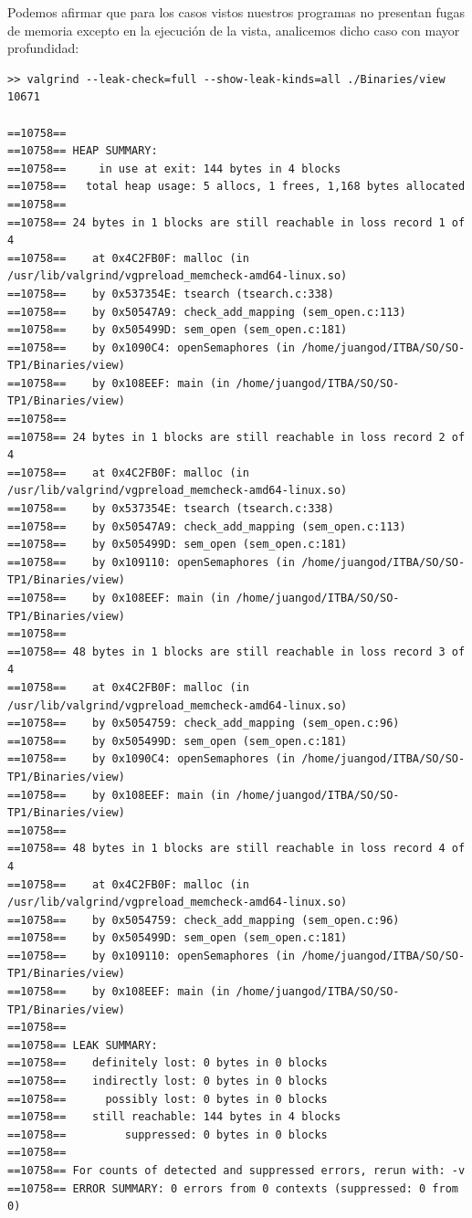 \documentclass[10pt,a4paper]{report}
\begin{document}
 Podemos afirmar que para los casos vistos nuestros programas no presentan fugas de memoria excepto en la ejecución de la vista, analicemos dicho caso con mayor profundidad:\newline\newline 

\begin{lstlisting}
>> valgrind --leak-check=full --show-leak-kinds=all ./Binaries/view 10671

==10758== 
==10758== HEAP SUMMARY:
==10758==     in use at exit: 144 bytes in 4 blocks
==10758==   total heap usage: 5 allocs, 1 frees, 1,168 bytes allocated
==10758== 
==10758== 24 bytes in 1 blocks are still reachable in loss record 1 of 4
==10758==    at 0x4C2FB0F: malloc (in /usr/lib/valgrind/vgpreload_memcheck-amd64-linux.so)
==10758==    by 0x537354E: tsearch (tsearch.c:338)
==10758==    by 0x50547A9: check_add_mapping (sem_open.c:113)
==10758==    by 0x505499D: sem_open (sem_open.c:181)
==10758==    by 0x1090C4: openSemaphores (in /home/juangod/ITBA/SO/SO-TP1/Binaries/view)
==10758==    by 0x108EEF: main (in /home/juangod/ITBA/SO/SO-TP1/Binaries/view)
==10758== 
==10758== 24 bytes in 1 blocks are still reachable in loss record 2 of 4
==10758==    at 0x4C2FB0F: malloc (in /usr/lib/valgrind/vgpreload_memcheck-amd64-linux.so)
==10758==    by 0x537354E: tsearch (tsearch.c:338)
==10758==    by 0x50547A9: check_add_mapping (sem_open.c:113)
==10758==    by 0x505499D: sem_open (sem_open.c:181)
==10758==    by 0x109110: openSemaphores (in /home/juangod/ITBA/SO/SO-TP1/Binaries/view)
==10758==    by 0x108EEF: main (in /home/juangod/ITBA/SO/SO-TP1/Binaries/view)
==10758== 
==10758== 48 bytes in 1 blocks are still reachable in loss record 3 of 4
==10758==    at 0x4C2FB0F: malloc (in /usr/lib/valgrind/vgpreload_memcheck-amd64-linux.so)
==10758==    by 0x5054759: check_add_mapping (sem_open.c:96)
==10758==    by 0x505499D: sem_open (sem_open.c:181)
==10758==    by 0x1090C4: openSemaphores (in /home/juangod/ITBA/SO/SO-TP1/Binaries/view)
==10758==    by 0x108EEF: main (in /home/juangod/ITBA/SO/SO-TP1/Binaries/view)
==10758== 
==10758== 48 bytes in 1 blocks are still reachable in loss record 4 of 4
==10758==    at 0x4C2FB0F: malloc (in /usr/lib/valgrind/vgpreload_memcheck-amd64-linux.so)
==10758==    by 0x5054759: check_add_mapping (sem_open.c:96)
==10758==    by 0x505499D: sem_open (sem_open.c:181)
==10758==    by 0x109110: openSemaphores (in /home/juangod/ITBA/SO/SO-TP1/Binaries/view)
==10758==    by 0x108EEF: main (in /home/juangod/ITBA/SO/SO-TP1/Binaries/view)
==10758== 
==10758== LEAK SUMMARY:
==10758==    definitely lost: 0 bytes in 0 blocks
==10758==    indirectly lost: 0 bytes in 0 blocks
==10758==      possibly lost: 0 bytes in 0 blocks
==10758==    still reachable: 144 bytes in 4 blocks
==10758==         suppressed: 0 bytes in 0 blocks
==10758== 
==10758== For counts of detected and suppressed errors, rerun with: -v
==10758== ERROR SUMMARY: 0 errors from 0 contexts (suppressed: 0 from 0)
\end{lstlisting}
\end{document}

